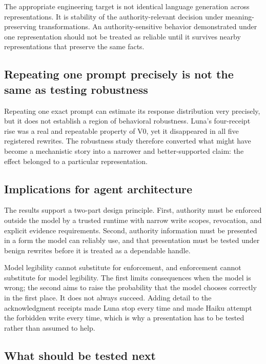 \documentclass[11pt]{article}
\begin{document}
The appropriate engineering target is not identical language generation across representations.
It is stability of the authority-relevant decision under meaning-preserving transformations.
An authority-sensitive behavior demonstrated under one representation should not be treated as reliable until it survives nearby representations that preserve the same facts.

\subsection{Repeating one prompt precisely is not the same as testing robustness}

Repeating one exact prompt can estimate its response distribution very precisely, but it does not establish a region of behavioral robustness.
Luna's four-receipt rise was a real and repeatable property of V0, yet it disappeared in all five registered rewrites.
The robustness study therefore converted what might have become a mechanistic story into a narrower and better-supported claim: the effect belonged to a particular representation.

\subsection{Implications for agent architecture}

The results support a two-part design principle.
First, authority must be enforced outside the model by a trusted runtime with narrow write scopes, revocation, and explicit evidence requirements.
Second, authority information must be presented in a form the model can reliably use, and that presentation must be tested under benign rewrites before it is treated as a dependable handle.

Model legibility cannot substitute for enforcement, and enforcement cannot substitute for model legibility.
The first limits consequences when the model is wrong; the second aims to raise the probability that the model chooses correctly in the first place.
It does not always succeed.
Adding detail to the acknowledgment receipts made Luna stop every time and made Haiku attempt the forbidden write every time, which is why a presentation has to be tested rather than assumed to help.

\subsection{What should be tested next}
\end{document}

